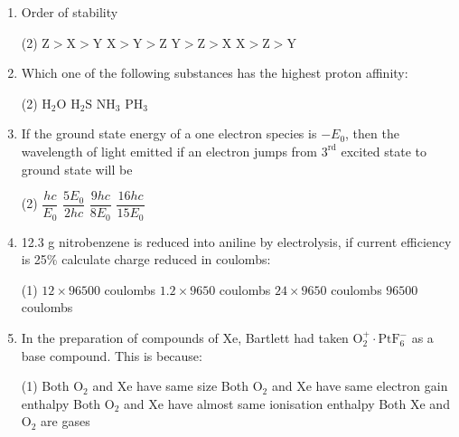 \documentclass[twocolumn]{article}
\renewcommand{\frac}[2]{\dfrac{#1}{#2}}
\begin{document}
\begin{enumerate}
    \item Order of stability
    \begin{center}
    \end{center}
    \begin{tasks}(2)
        \task \( \mathrm{Z > X > Y} \)
        \task \( \mathrm{X > Y > Z} \)
        \task \( \mathrm{Y > Z > X} \)
        \task \( \mathrm{X > Z > Y} \)
    \end{tasks}
    
    \item Which one of the following substances has the highest proton affinity:
    \begin{tasks}(2)
        \task \( \mathrm{H_2O} \)
        \task \( \mathrm{H_2S} \)
        \task \( \mathrm{NH_3} \)
        \task \( \mathrm{PH_3} \)
    \end{tasks}
    
    \item If the ground state energy of a one electron species is \(-E_0\), then the wavelength of light emitted if an electron jumps from \(3^\text{rd}\) excited state to ground state will be
    \begin{tasks}(2)
        \task \( \frac{hc}{E_0} \)
        \task \( \frac{5E_0}{2hc} \)
        \task \( \frac{9hc}{8E_0} \)
        \task \( \frac{16hc}{15E_0} \)
    \end{tasks}
    
    \item 12.3 g nitrobenzene is reduced into aniline by electrolysis, if current efficiency is 25\% calculate charge reduced in coulombs:
    \begin{tasks}(1)
        \task \( 12 \times 96500 \) coulombs
        \task \( 1.2 \times 9650 \) coulombs
        \task \( 24 \times 9650 \) coulombs
        \task \( 96500 \) coulombs
    \end{tasks}
    
    \item In the preparation of compounds of Xe, Bartlett had taken \( \mathrm{O_2^+}\cdot\mathrm{PtF_6^-} \) as a base compound. This is because:
    \begin{tasks}(1)
        \task Both \( \mathrm{O_2} \) and Xe have same size
        \task Both \( \mathrm{O_2} \) and Xe have same electron gain enthalpy
        \task Both \( \mathrm{O_2} \) and Xe have almost same ionisation enthalpy
        \task Both Xe and \( \mathrm{O_2} \) are gases
    \end{tasks}


\end{enumerate}
\end{document}
